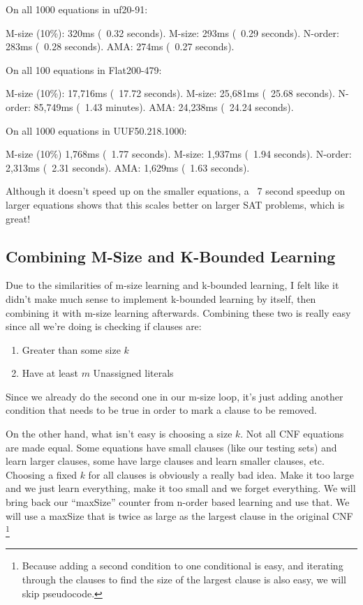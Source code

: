 \documentclass[../main.tex]{subfiles}
\begin{document}
\begin{FVerbatim}
On all 1000 equations in uf20-91:

M-size (10\%):  320ms (~0.32 seconds).
M-size:         293ms (~0.29 seconds).
N-order:        283ms (~0.28 seconds).
AMA:            274ms (~0.27 seconds).

On all 100 equations in Flat200-479:

M-size (10\%):  17,716ms (~17.72 seconds).
M-size:         25,681ms (~25.68 seconds).
N-order:        85,749ms (~1.43 minutes).
AMA:            24,238ms (~24.24 seconds).

On all 1000 equations in UUF50.218.1000:

M-size (10\%)   1,768ms (~1.77 seconds).
M-size:         1,937ms (~1.94 seconds).
N-order:        2,313ms (~2.31 seconds).
AMA:            1,629ms (~1.63 seconds).
\end{FVerbatim}
\noindent
Although it doesn't speed up on the smaller equations, a ~7 second speedup on larger 
equations shows that this scales better on larger SAT problems, which is great!

\subsection{Combining M-Size and K-Bounded Learning}

Due to the similarities of m-size learning and k-bounded learning, I felt like it 
didn't make much sense to implement k-bounded learning by itself, then combining it 
with m-size learning afterwards. Combining these two is really easy since all we're 
doing is checking if clauses are:
\begin{enumerate}
    \item Greater than some size $k$
    \item Have at least $m$ Unassigned literals
\end{enumerate}
Since we already do the second one in our m-size loop, it's just adding another condition
that needs to be true in order to mark a clause to be removed.

On the other hand, what isn't easy is choosing a size $k$. Not all CNF equations are 
made equal. Some equations have small clauses (like our testing sets) and learn larger 
clauses, some have large clauses and learn smaller clauses, etc. Choosing a fixed $k$ for 
all clauses is obviously a really bad idea. Make it too large and we just learn everything, 
make it too small and we forget everything. We will bring back our ``maxSize'' counter 
from n-order based learning and use that. We will use a maxSize that is twice as large as 
the largest clause in the original CNF
\footnote{Because adding a second condition to one conditional is easy, and iterating through 
the clauses to find the size of the largest clause is also easy, we will skip pseudocode.}
\end{document}
